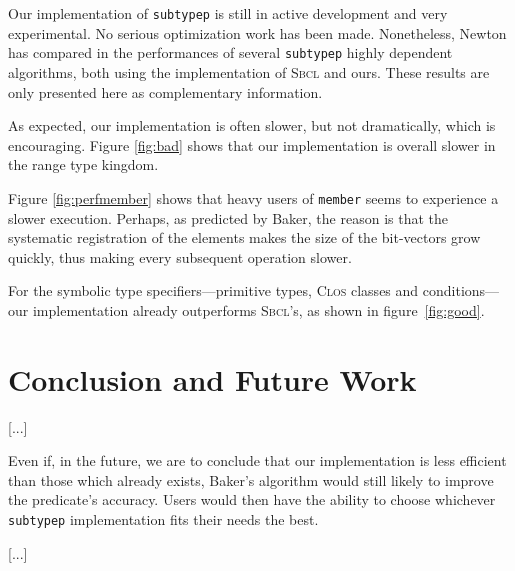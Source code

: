 \documentclass[format=sigconf]{acmart}
\newcommand\code[2][\small]{\sloppy\texttt{#1#2}}
\theoremstyle{definition}
\newcommand\sbcl{\textsc{Sbcl}}
\begin{document}
Our implementation of \code{subtypep} is still in active development and very
experimental. No serious optimization work has been made. Nonetheless, Newton
has compared in \cite{newton.18.phd} the performances of several \code{subtypep}
highly dependent algorithms, both using the implementation of \sbcl{} and ours.
These results are only presented here as complementary information.

As expected, our implementation is often slower, but not dramatically, which is
encouraging. Figure \ref{fig:bad} shows that our implementation is overall
slower in the range type kingdom.

Figure \ref{fig:perfmember} shows that heavy users of \code{member} seems to
experience a slower execution. Perhaps, as predicted by Baker, the reason is
that the systematic registration of the elements makes the size of the
bit-vectors grow quickly, thus making every subsequent operation slower.

For the symbolic type specifiers---primitive types, \textsc{Clos} classes and
conditions---our implementation already outperforms \sbcl's, as shown in
figure~\ref{fig:good}.

\section{Conclusion and Future Work}
[...]

Even if, in the future, we are to conclude that our implementation is less
efficient than those which already exists, Baker's algorithm would still likely to
improve the predicate's accuracy. Users would then have the ability to
choose whichever \code{subtypep} implementation fits their needs the best.

[...]


\end{document}
